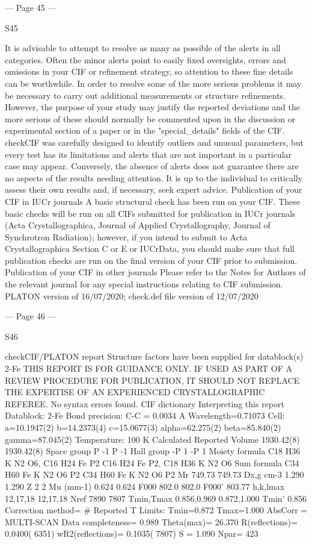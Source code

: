 --- Page 45 ---
 
 
S45 
 
 
 
It is advisable to attempt to resolve as many as possible of the alerts in all categories. Often the
minor alerts point to easily fixed oversights, errors and omissions in your CIF or refinement
strategy, so attention to these fine details can be worthwhile. In order to resolve some of the more
serious problems it may be necessary to carry out additional measurements or structure
refinements. However, the purpose of your study may justify the reported deviations and the more
serious of these should normally be commented upon in the discussion or experimental section of a
paper or in the "special_details" fields of the CIF. checkCIF was carefully designed to identify
outliers and unusual parameters, but every test has its limitations and alerts that are not important
in a particular case may appear. Conversely, the absence of alerts does not guarantee there are no
aspects of the results needing attention. It is up to the individual to critically assess their own
results and, if necessary, seek expert advice.
Publication of your CIF in IUCr journals 
A basic structural check has been run on your CIF. These basic checks will be run on all CIFs
submitted for publication in IUCr journals (Acta Crystallographica, Journal of Applied 
Crystallography, Journal of Synchrotron Radiation); however, if you intend to submit to Acta
Crystallographica Section C or E or IUCrData, you should make sure that full publication checks
are run on the final version of your CIF prior to submission.
Publication of your CIF in other journals 
Please refer to the Notes for Authors of the relevant journal for any special instructions relating to
CIF submission.
PLATON version of 16/07/2020; check.def file version of 12/07/2020 


--- Page 46 ---
 
 
S46 
 
 
 
checkCIF/PLATON report 
Structure factors have been supplied for datablock(s) 2-Fe
THIS REPORT IS FOR GUIDANCE ONLY. IF USED AS PART OF A REVIEW PROCEDURE
FOR PUBLICATION, IT SHOULD NOT REPLACE THE EXPERTISE OF AN EXPERIENCED
CRYSTALLOGRAPHIC REFEREE.
No syntax errors found.        CIF dictionary        Interpreting this report
Datablock: 2-Fe 
Bond precision:
C-C = 0.0034 A
Wavelength=0.71073
Cell:
a=10.1947(2)
b=14.2373(4)
c=15.0677(3)
alpha=62.275(2)
beta=85.840(2)
gamma=87.045(2)
Temperature: 
100 K
Calculated
Reported
Volume
1930.42(8)
1930.42(8)
Space group
P -1 
P -1 
Hall group
-P 1 
-P 1 
Moiety formula
C18 H36 K N2 O6, C16 H24
Fe P2
C16 H24 Fe P2, C18 H36 K
N2 O6
Sum formula
C34 H60 Fe K N2 O6 P2
C34 H60 Fe K N2 O6 P2
Mr
749.73
749.73
Dx,g cm-3
1.290
1.290
Z
2
2
Mu (mm-1)
0.624
0.624
F000
802.0
802.0
F000’
803.77
h,k,lmax
12,17,18
12,17,18
Nref
7890 
7807 
Tmin,Tmax
0.856,0.969
0.872,1.000
Tmin’
0.856
Correction method= # Reported T Limits: Tmin=0.872 Tmax=1.000
AbsCorr = MULTI-SCAN
Data completeness= 0.989
Theta(max)= 26.370
R(reflections)= 0.0400( 6351)
wR2(reflections)= 0.1035( 7807)
S = 1.090
Npar= 423


